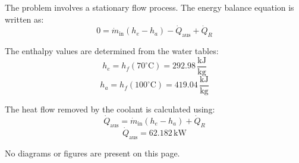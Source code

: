 The problem involves a stationary flow process. The energy balance equation is written as:  
\[
0 = \dot{m}_{\text{in}} \left( h_e - h_a \right) - \dot{Q}_{\text{aus}} + \dot{Q}_R
\]  

The enthalpy values are determined from the water tables:  
\[
h_e = h_f(70^\circ\text{C}) = 292.98 \, \frac{\text{kJ}}{\text{kg}}
\]  
\[
h_a = h_f(100^\circ\text{C}) = 419.04 \, \frac{\text{kJ}}{\text{kg}}
\]  

The heat flow removed by the coolant is calculated using:  
\[
\dot{Q}_{\text{aus}} = \dot{m}_{\text{in}} \left( h_e - h_a \right) + \dot{Q}_R
\]  
\[
\dot{Q}_{\text{aus}} = 62.182 \, \text{kW}
\]  

No diagrams or figures are present on this page.